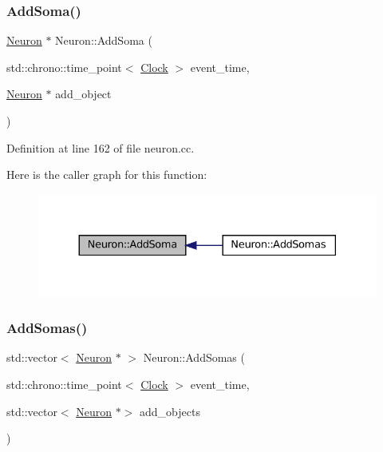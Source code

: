 \subsubsection{\texorpdfstring{Add\+Soma()}{AddSoma()}}
{\footnotesize\ttfamily \mbox{\hyperlink{class_neuron}{Neuron}} $\ast$ Neuron\+::\+Add\+Soma (\begin{DoxyParamCaption}\item[{std\+::chrono\+::time\+\_\+point$<$ \mbox{\hyperlink{universe_8h_a0ef8d951d1ca5ab3cfaf7ab4c7a6fd80}{Clock}} $>$}]{event\+\_\+time,  }\item[{\mbox{\hyperlink{class_neuron}{Neuron}} $\ast$}]{add\+\_\+object }\end{DoxyParamCaption})}



Definition at line 162 of file neuron.\+cc.

Here is the caller graph for this function\+:\nopagebreak
\begin{figure}[H]
\begin{center}
\leavevmode
\includegraphics[width=330pt]{class_neuron_a6198fa352056e3bbe1e979adf088b900_icgraph}
\end{center}
\end{figure}
\mbox{\label{class_neuron_a78a0f48a669b6ea20280829304e51de2}} 
\subsubsection{\texorpdfstring{Add\+Somas()}{AddSomas()}}
{\footnotesize\ttfamily std\+::vector$<$ \mbox{\hyperlink{class_neuron}{Neuron}} $\ast$ $>$ Neuron\+::\+Add\+Somas (\begin{DoxyParamCaption}\item[{std\+::chrono\+::time\+\_\+point$<$ \mbox{\hyperlink{universe_8h_a0ef8d951d1ca5ab3cfaf7ab4c7a6fd80}{Clock}} $>$}]{event\+\_\+time,  }\item[{std\+::vector$<$ \mbox{\hyperlink{class_neuron}{Neuron}} $\ast$$>$}]{add\+\_\+objects }\end{DoxyParamCaption})}



